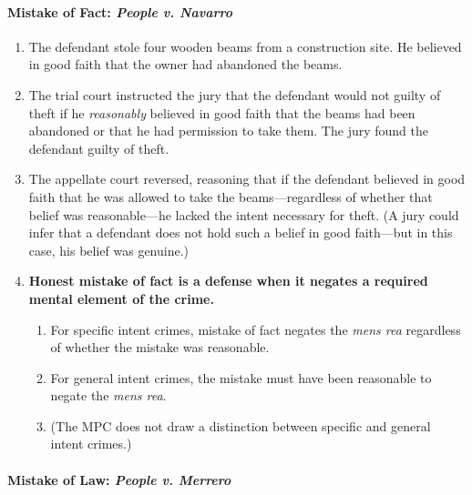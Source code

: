 \paragraph{Mistake of Fact: \emph{People v. Navarro}}

\begin{enumerate}
    \item The defendant stole four wooden beams from a construction site. He believed in good faith that the owner had abandoned the beams.
    \item The trial court instructed the jury that the defendant would not guilty of theft if he \emph{reasonably} believed in good faith that the beams had been abandoned or that he had permission to take them. The jury found the defendant guilty of theft.
    \item The appellate court reversed, reasoning that if the defendant believed in good faith that he was allowed to take the beams---regardless of whether that belief was reasonable---he lacked the intent necessary for theft. (A jury could infer that a defendant does not hold such a belief in good faith---but in this case, his belief was genuine.)
    \item \textbf{Honest mistake of fact is a defense when it negates a required mental element of the crime.}
    \begin{enumerate}
        \item For specific intent crimes, mistake of fact negates the \emph{mens rea} regardless of whether the mistake was reasonable.
        \item For general intent crimes, the mistake must have been reasonable to negate the \emph{mens rea}.
        \item (The MPC does not draw a distinction between specific and general intent crimes.)
    \end{enumerate}
\end{enumerate}

\paragraph{Mistake of Law: \emph{People v. Merrero}}

